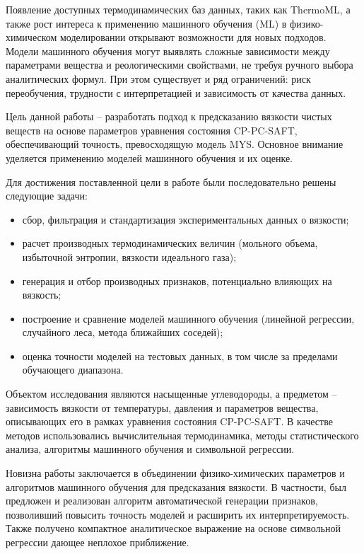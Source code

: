 \documentclass[a4paper,12pt]{article}
\begin{document}
  Появление доступных термодинамических баз данных, таких как ThermoML, а также рост интереса к применению машинного обучения (ML) в физико-химическом моделировании открывают возможности для новых подходов. Модели машинного обучения могут выявлять сложные зависимости между параметрами вещества и реологическими свойствами, не требуя ручного выбора аналитических формул. При этом существует и ряд ограничений: риск переобучения, трудности с интерпретацией и зависимость от качества данных.
  
  Цель данной работы -- разработать подход к предсказанию вязкости чистых веществ на основе параметров уравнения состояния CP-PC-SAFT, обеспечивающий точность, превосходящую модель MYS. Основное внимание уделяется применению моделей машинного обучения и их оценке.

  Для достижения поставленной цели в работе были последовательно решены следующие задачи:
  \begin{itemize}
    \item сбор, фильтрация и стандартизация экспериментальных данных о вязкости;
    \item расчет производных термодинамических величин (мольного объема, избыточной энтропии, вязкости идеального газа);
    \item генерация и отбор производных признаков, потенциально влияющих на вязкость;
    \item построение и сравнение моделей машинного обучения (линейной регрессии, случайного леса, метода ближайших соседей);
    \item оценка точности моделей на тестовых данных, в том числе за пределами обучающего диапазона.
  \end{itemize}

  Объектом исследования являются насыщенные углеводороды, а предметом -- зависимость вязкости от температуры, давления и параметров вещества, описывающих его в рамках уравнения состояния CP-PC-SAFT. В качестве методов использовались вычислительная термодинамика, методы статистического анализа, алгоритмы машинного обучения и символьной регрессии.

  Новизна работы заключается в объединении физико-химических параметров и алгоритмов машинного обучения для предсказания вязкости. В частности, был предложен и реализован алгоритм автоматической генерации признаков, позволивший повысить точность моделей и расширить их интерпретируемость. Также получено компактное аналитическое выражение на основе символьной регрессии дающее неплохое приближение.
\end{document}
